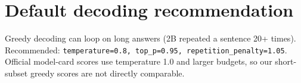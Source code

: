 \documentclass[11pt,a4paper]{article}
\begin{document}
\section{Default decoding recommendation}
Greedy decoding can loop on long answers (2B repeated a sentence 20+ times). Recommended:
\texttt{temperature=0.8, top\_p=0.95, repetition\_penalty=1.05}. Official model-card scores
use temperature 1.0 and larger budgets, so our short-subset greedy scores are not directly
comparable.
\end{document}
